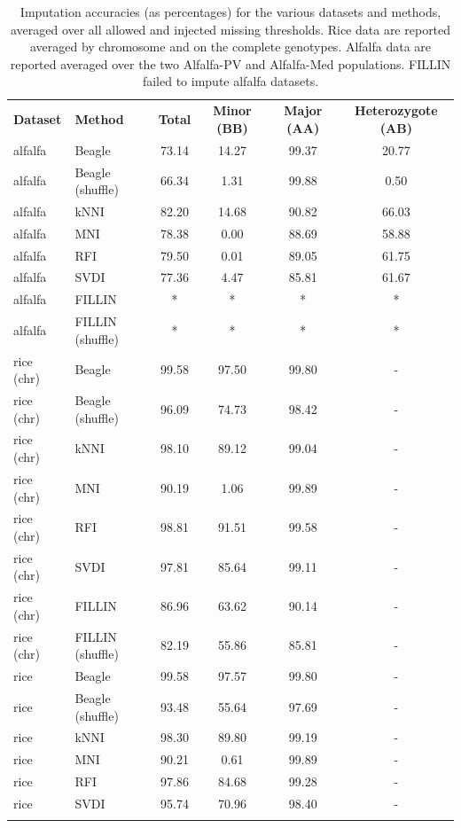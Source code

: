 \makeatletter{}\begin{table}
\centering
\caption[Accuracy statistics]{Imputation accuracies (as percentages) for the various
datasets and methods, averaged over all allowed and injected missing thresholds. Rice data are reported averaged by chromosome and on the complete genotypes. Alfalfa data are reported averaged over the two Alfalfa-PV and Alfalfa-Med populations. FILLIN failed to impute alfalfa datasets.}
\label{tab:accuracy_statistics}
\begin{tabular}{llcccc}
\hline\noalign{\smallskip}
\noalign{\smallskip}\hline\noalign{\smallskip}
\textbf{Dataset} & \textbf{Method} & \textbf{Total} & \textbf{Minor (BB)} & \textbf{Major (AA)} & \textbf{Heterozygote (AB)}\\
\noalign{\smallskip}\Xhline{3\arrayrulewidth}\noalign{\smallskip}
alfalfa & Beagle & 73.14 & 14.27 & 99.37 & 20.77\\
alfalfa & Beagle (shuffle) & 66.34 & 1.31 & 99.88 & 0.50\\
alfalfa & kNNI & 82.20 & 14.68 & 90.82 & 66.03\\
alfalfa & MNI & 78.38 & 0.00 & 88.69 & 58.88\\
alfalfa & RFI  & 79.50 & 0.01 & 89.05 & 61.75\\
alfalfa & SVDI & 77.36 & 4.47 & 85.81 & 61.67\\
alfalfa & FILLIN & * & * & * & *\\
alfalfa & FILLIN (shuffle)  & * & * & * & *\\
rice (chr) & Beagle & 99.58 & 97.50 & 99.80 & -\\
rice (chr) & Beagle (shuffle) & 96.09 & 74.73 & 98.42 & -\\
rice (chr) & kNNI & 98.10 & 89.12 & 99.04 & -\\
rice (chr) & MNI & 90.19 & 1.06 & 99.89 & -\\
rice (chr) & RFI  & 98.81 & 91.51 & 99.58 & -\\
rice (chr) & SVDI & 97.81 & 85.64 & 99.11 & -\\
rice (chr) & FILLIN & 86.96 & 63.62 & 90.14 & -\\
rice (chr) & FILLIN (shuffle)  & 82.19 & 55.86 & 85.81 & -\\
rice & Beagle & 99.58 & 97.57 & 99.80 & -\\
rice & Beagle (shuffle) & 93.48 & 55.64 & 97.69 & -\\
rice & kNNI & 98.30 & 89.80 & 99.19 & -\\
rice & MNI & 90.21 & 0.61 & 99.89 & -\\
rice & RFI  & 97.86 & 84.68 & 99.28 & -\\
rice & SVDI & 95.74 & 70.96 & 98.40 & -\\
\noalign{\smallskip}\hline
\end{tabular}
\end{table}



